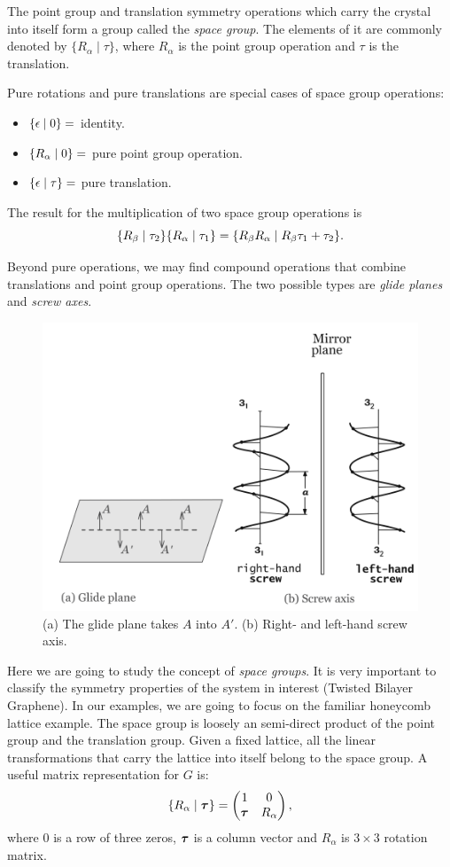 The point group and translation symmetry operations which carry the crystal into itself form a group called the \textit{space group}. The elements of it are commonly denoted by  $\{ R_\alpha \mid \tau \} $, where $R_\alpha$ is the point group operation and $\tau$ is the translation.

Pure rotations and pure translations are special cases of space group operations:
\begin{itemize}
\item $\{ \epsilon \mid 0 \} =$ identity.
\item $\{ R_\alpha \mid 0 \} =$ pure point group operation.
\item $\{ \epsilon \mid \tau \} =$ pure translation.
\end{itemize}

The result for the multiplication of two space group operations is
$$
\{ R_\beta \mid \tau_2 \} \{ R_\alpha \mid \tau_1 \} = \{ R_\beta R_\alpha \mid R_\beta\tau_1 + \tau_2 \}.
$$

Beyond pure operations, we may find compound operations that combine translations and point group operations. The two possible types are \textit{glide planes} and \textit{screw axes}.
\begin{figure}[H]
\centering
\includegraphics[width=0.5\linewidth]{fig/glideplane-screwaxis.png}
\caption{(a) The glide plane takes $A$ into $A'$. (b) Right- and left-hand screw axis.}
\label{fig:glideplane-screwaxis}
\end{figure}

Here we are going to study the concept of \textit{space groups}. It is very important to classify the symmetry properties of the system in interest (Twisted Bilayer Graphene). In our examples, we are going to focus on the familiar honeycomb lattice example. The space group is loosely an semi-direct product of the point group and the translation group. Given a fixed lattice, all the linear transformations that carry the lattice into itself belong to the space group. A useful matrix representation for $G$ is:
\begin{equation} \label{eq:spacegroup-rep}
\{ R_\alpha \mid {\bm{\tau}} \} =
\begin{pmatrix}
1 & 0 \\
{\bm{\tau}} & R_\alpha
\end{pmatrix},
\end{equation}
where $0$ is a row of three zeros, ${\bm{\tau}}$ is a column vector and $R_\alpha$ is $3\times 3$ rotation matrix.

